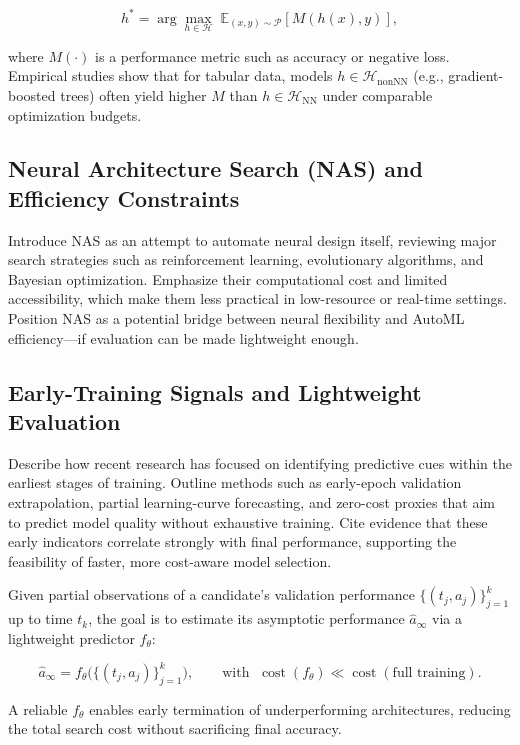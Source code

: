 \documentclass[stu,12pt,floatsintext,doublespacing]{apa7}
\begin{document}
\begin{equation}
h^{*} = \arg\max_{h \in \mathcal{H}} \; \mathbb{E}_{(x,y)\sim \mathcal{P}}[M(h(x), y)],
\end{equation}

where $M(\cdot)$ is a performance metric such as accuracy or negative loss.
Empirical studies show that for tabular data, models $h \in \mathcal{H}_{\text{nonNN}}$ (e.g., gradient-boosted trees) often yield higher $M$ than $h \in \mathcal{H}_{\text{NN}}$ under comparable optimization budgets.


\subsection{Neural Architecture Search (NAS) and Efficiency Constraints}
Introduce NAS as an attempt to automate neural design itself, reviewing major search strategies such as reinforcement learning, evolutionary algorithms, and Bayesian optimization. 
Emphasize their computational cost and limited accessibility, which make them less practical in low-resource or real-time settings. 
Position NAS as a potential bridge between neural flexibility and AutoML efficiency—if evaluation can be made lightweight enough.

\subsection{Early-Training Signals and Lightweight Evaluation}
Describe how recent research has focused on identifying predictive cues within the earliest stages of training. Outline methods such as early-epoch validation extrapolation, partial learning-curve forecasting, and zero-cost proxies that aim to predict model quality without exhaustive training. 
Cite evidence that these early indicators correlate strongly with final performance, supporting the feasibility of faster, more cost-aware model selection.

Given partial observations of a candidate’s validation performance 
$\{(t_j, a_j)\}_{j=1}^{k}$ up to time $t_k$, 
the goal is to estimate its asymptotic performance $\hat{a}_{\infty}$ via a lightweight predictor $f_{\theta}$:

\begin{equation}
\hat{a}_{\infty} = f_{\theta}\big(\{(t_j, a_j)\}_{j=1}^{k}\big),
\qquad
\text{with } \; \operatorname{cost}(f_{\theta}) \ll \operatorname{cost}(\text{full training}).
\end{equation}

A reliable $f_{\theta}$ enables early termination of underperforming architectures, reducing the total search cost without sacrificing final accuracy.
\end{document}
